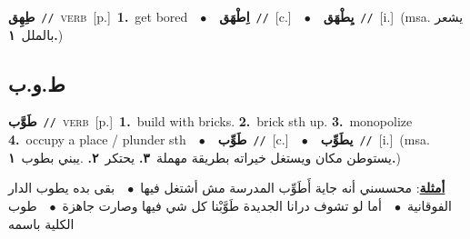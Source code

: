 \documentclass[10pt,a4paper,twoside]{article} %
\begin{document}
\begin{multicols}{2}
{\setlength\topsep{0pt}\textbf{\foreignlanguage{arabic}{طِهِق}}\ {\color{gray}\texttt{//}\color{black}}\ \textsc{verb}\ [p.]\ \textbf{1.}~get bored\ \ $\bullet$\ \ \setlength\topsep{0pt}\textbf{\foreignlanguage{arabic}{اِطْهَق}}\ {\color{gray}\texttt{//}\color{black}}\ [c.]\ \ $\bullet$\ \ \setlength\topsep{0pt}\textbf{\foreignlanguage{arabic}{يِطْهَق}}\ {\color{gray}\texttt{//}\color{black}}\ [i.]\ \color{gray}(msa. \foreignlanguage{arabic}{يشعر بالملل}~\foreignlanguage{arabic}{\textbf{١.}})\color{black}\ } \vspace{2mm}

\vspace{-3mm}
\subsection*{\color{blue}\foreignlanguage{arabic}{ط.و.ب}\color{blue}{}} 

{\setlength\topsep{0pt}\textbf{\foreignlanguage{arabic}{طَوَّب}}\ {\color{gray}\texttt{//}\color{black}}\ \textsc{verb}\ [p.]\ \textbf{1.}~build with bricks.  \textbf{2.}~brick sth up.  \textbf{3.}~monopolize  \textbf{4.}~occupy a place / plunder sth\ \ $\bullet$\ \ \setlength\topsep{0pt}\textbf{\foreignlanguage{arabic}{طَوِّب}}\ {\color{gray}\texttt{//}\color{black}}\ [c.]\ \ $\bullet$\ \ \setlength\topsep{0pt}\textbf{\foreignlanguage{arabic}{يطَوِّب}}\ {\color{gray}\texttt{//}\color{black}}\ [i.]\ \color{gray}(msa. \foreignlanguage{arabic}{يستوطن مكان ويستغل خيراته بطريقة مهملة}~\foreignlanguage{arabic}{\textbf{٣.}}  \foreignlanguage{arabic}{يحتكر}~\foreignlanguage{arabic}{\textbf{٢.}}  .\foreignlanguage{arabic}{يبني بطوب}~\foreignlanguage{arabic}{\textbf{١.}})\color{black}\  \begin{flushright}\color{gray}\foreignlanguage{arabic}{\textbf{\underline{\foreignlanguage{arabic}{أمثلة}}}: محسسني أنه جاية أَطَوِّب المدرسة مش أشتغل فيها\ $\bullet$\ \  بقى بده يطوب الدار الفوقانية\ $\bullet$\ \  أما لو تشوف درانا الجديدة طَوَّبْنا كل شي فيها وصارت جاهزة\ $\bullet$\ \  طوب الكلية باسمه}\end{flushright}\color{black}} \vspace{2mm}


\end{multicols}
\end{document}
